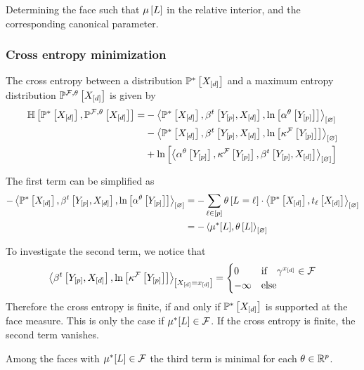 Determining the face such that $\mu\left[L\right]$ in the relative interior, and the corresponding canonical parameter.

\subsubsection{Cross entropy minimization}

%
The cross entropy between a distribution $\mathbb{P}^*\left[X_{[d]}\right]$ and a maximum entropy distribution $\mathbb{P}^{\mathcal{F},\theta}\left[X_{[d]}\right]$ is given by
\begin{align*}
    \centropyof{\gendistributionwith
    }{
        \probofat{\facesymbol,\weightparam}{\shortcatvariables}
    }
    = &-\contraction{\gendistributionwith,\bencsstatwith,\lnof{\softacttensorwith}} \\%
    &- \contraction{\gendistributionwith,\bencsstatwith,\lnof{\kcoreofat{\facesymbol}{\headvariables}}} \\%
    &+ \lnof{\contraction{\softacttensorwith,\kcoreofat{\facesymbol}{\headvariables},\bencsstatwith}} %
\end{align*}


The first term can be simplified as
\begin{align*}
    -\left\langle \mathbb{P}^*\left[X_{[d]}\right],\beta^{t}\left[Y_{[p]},X_{[d]}\right],\ln \left[ \alpha^\theta\left[Y_{[p]}\right] \right]\right\rangle_{\left[ \varnothing \right]}
    &= -\sum_{\ell\in[p]} \theta\left[L_{}=\ell_{}\right]\cdot\left\langle \mathbb{P}^*\left[X_{[d]}\right],t_{\ell}\left[X_{[d]}\right]\right\rangle_{\left[ \varnothing \right]} \\
    &= -\left\langle \mu^*[L],\theta\left[L\right]\right\rangle_{\left[ \varnothing \right]}
\end{align*}

To investigate the second term, we notice that
\begin{align*}
    \left\langle \beta^{t}\left[Y_{[p]},X_{[d]}\right],\ln \left[ \kappa^{\mathcal{F}}\left[Y_{[p]}\right] \right]\right\rangle_{\left[ X_{[d]}=x_{[d]} \right]}
    = \begin{cases}
          0         & \text{if}\quad \gamma^{x_{[d]}} \in \mathcal{F} \\
          -\infty   & \text{else}
    \end{cases}
\end{align*}
Therefore the cross entropy is finite, if and only if $\mathbb{P}^*\left[X_{[d]}\right]$ is supported at the face measure.
This is only the case if $\mu^*[L]\in\mathcal{F}$.
If the cross entropy is finite, the second term vanishes.

Among the faces with $\mu^*[L]\in\mathcal{F}$ the third term is minimal for each $\theta\in\mathbb{R}^{p}$.

